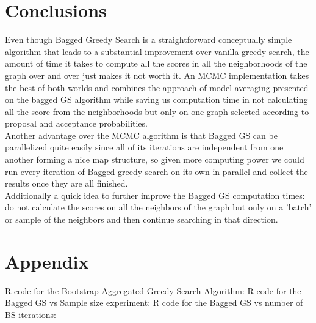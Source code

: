 \documentclass{article}
\begin{document}
	\section{Conclusions}
	Even though Bagged Greedy Search is a straightforward conceptually simple
	algorithm that leads to a substantial improvement over vanilla greedy search,
	the amount of time it takes to compute all the scores in all the neighborhoods 
	of the graph over and over just makes it not worth it. An MCMC implementation 
	takes the best of both worlds and combines the approach of model averaging 
	presented on the bagged GS algorithm while saving us
	computation time in not calculating all the score from the neighborhoods but 
	only on one graph selected according to proposal and acceptance probabilities. 
	\\
	Another advantage over the MCMC algorithm is that Bagged GS can be
	parallelized quite easily since all of its iterations are independent from
	one another forming a nice map structure, so given more computing power we
	could run every iteration of Bagged greedy search on its own in parallel and
	collect the results once they are all finished.
	\\
	Additionally a quick idea to further improve the Bagged GS computation times: do not
	calculate the scores on all the neighbors of the graph but only on a
	'batch' or sample of the neighbors and then continue searching in that
	direction. \\

	\section*{Appendix}
	R code for the Bootstrap Aggregated Greedy Search Algorithm:
	R code for the Bagged GS vs Sample size experiment:
	R code for the Bagged GS vs number of BS iterations:

	
	
\end{document}
